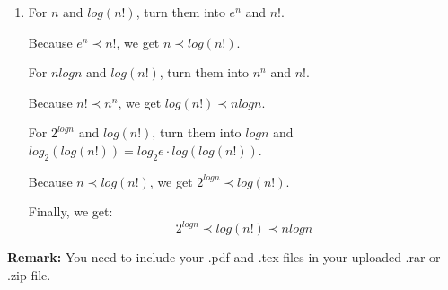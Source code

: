 \documentclass[12pt,a4paper]{article}
\makeatletter
\newtheorem*{solution}{Solution}
\theoremstyle{definition}
\renewenvironment{solution}[1][Solution] {\par\pushQED{\qed}\normalfont\topsep6\p@\@plus6\p@\relax\trivlist\item[\hskip\labelsep\bfseries#1\@addpunct{.}]\ignorespaces}{\popQED\endtrivlist\@endpefalse} \makeatother
\makeatother
\begin{document}
\begin{enumerate}
\begin{solution}
For $n$ and $log(n!)$, turn them into $e^n$ and $n!$.

Because $e^n\prec n!$, we get $n\prec log(n!)$.

For $nlogn$ and $log(n!)$, turn them into $n^n$ and $n!$.

Because $n!\prec n^n$, we get $log(n!) \prec nlogn$.

For $2^{logn}$ and $log(n!)$, turn them into $logn$ and $log_2(log(n!)) =log_2e \cdot log(log(n!))$.

Because $n\prec log(n!)$, we get $2^{logn}\prec log(n!)$.

Finally, we get:
$$
2^{logn}\prec log(n!) \prec nlogn
$$
 \end{solution}


\end{enumerate}

\vspace{20pt}

\textbf{Remark:} You need to include your .pdf and .tex files in your uploaded .rar or .zip file.

\end{document}
